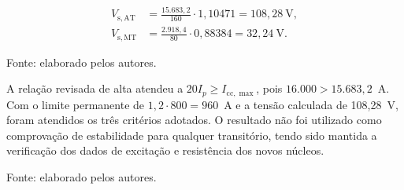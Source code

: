 \begin{equation}
    \begin{aligned}
        V_{\mathrm{s,AT}}&=\frac{15.683{,}2}{160}\cdot1{,}10471
        =108{,}28~\mathrm{V},\\
        V_{\mathrm{s,MT}}&=\frac{2.918{,}4}{80}\cdot0{,}88384
        =32{,}24~\mathrm{V}.
    \end{aligned}
    \label{eq:87_tensoes_tc}
\end{equation}

\begin{table}[htbp]
    \centering
    \caption{Verificação dos TCs exclusivos da proteção diferencial.}
    \label{tab:87_verificacao_tc}
    \par\vspace{2pt}
    {\small Fonte: elaborado pelos autores.}
\end{table}

A relação revisada de alta atendeu a $20I_p\geq I_{\mathrm{cc},\max}$, pois $16.000>15.683{,}2$~A. Com o limite permanente de $1{,}2\cdot800=960$~A e a tensão calculada de 108,28~V, foram atendidos os três critérios adotados. O resultado não foi utilizado como comprovação de estabilidade para qualquer transitório, tendo sido mantida a verificação dos dados de excitação e resistência dos novos núcleos.

\begin{table}[htbp]
    \centering
    \caption{Especificação proposta dos núcleos exclusivos de 87T.}
    \label{tab:87_especificacao_tc}
    \par\vspace{2pt}
    {\small Fonte: elaborado pelos autores.}
\end{table}

